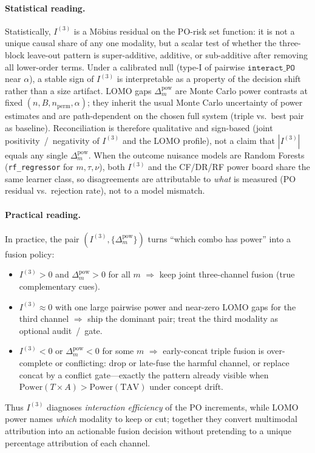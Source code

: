\paragraph{Statistical reading.}
Statistically, $I^{(3)}$ is a M\"obius residual on the PO-risk set function:
it is not a unique causal share of any one modality, but a scalar test of
whether the three-block leave-out pattern is super-additive, additive, or
sub-additive after removing all lower-order terms.
Under a calibrated null (type-I of pairwise $\texttt{interact\_PO}$ near
$\alpha$), a stable sign of $I^{(3)}$ is interpretable as a property of the
decision shift rather than a size artifact.
LOMO gaps $\Delta^{\mathrm{pow}}_{m}$ are Monte Carlo power contrasts at
fixed $(n,B,n_{\mathrm{perm}},\alpha)$; they inherit the usual Monte Carlo
uncertainty of power estimates and are path-dependent on the chosen full
system (triple vs.\ best pair as baseline).
Reconciliation is therefore qualitative and sign-based
(joint positivity~/~negativity of $I^{(3)}$ and the LOMO profile),
not a claim that $|I^{(3)}|$ equals any single $\Delta^{\mathrm{pow}}_{m}$.
When the outcome nuisance models are Random Forests
(\texttt{rf\_regressor} for $m,\tau,\nu$), both $I^{(3)}$ and the CF/DR/RF
power board share the same learner class, so disagreements are attributable
to \emph{what} is measured (PO residual vs.\ rejection rate), not to a
model mismatch.

\paragraph{Practical reading.}
In practice, the pair $(I^{(3)},\{\Delta^{\mathrm{pow}}_{m}\})$ turns
``which combo has power'' into a fusion policy:
\begin{itemize}
  \item $I^{(3)}>0$ and $\Delta^{\mathrm{pow}}_{m}>0$ for all $m$
  $\Rightarrow$ keep joint three-channel fusion (true complementary cues).
  \item $I^{(3)}\approx 0$ with one large pairwise power and near-zero LOMO
  gaps for the third channel
  $\Rightarrow$ ship the dominant pair; treat the third modality as optional
  audit~/~gate.
  \item $I^{(3)}<0$ or $\Delta^{\mathrm{pow}}_{m}<0$ for some $m$
  $\Rightarrow$ early-concat triple fusion is over-complete or conflicting:
  drop or late-fuse the harmful channel, or replace concat by a conflict
  gate---exactly the pattern already visible when
  $\mathrm{Power}(T{\times}A)>\mathrm{Power}(\mathrm{TAV})$ under concept
  drift.
\end{itemize}
Thus $I^{(3)}$ diagnoses \emph{interaction efficiency} of the PO increments,
while LOMO power names \emph{which} modality to keep or cut; together they
convert multimodal attribution into an actionable fusion decision without
pretending to a unique percentage attribution of each channel.
